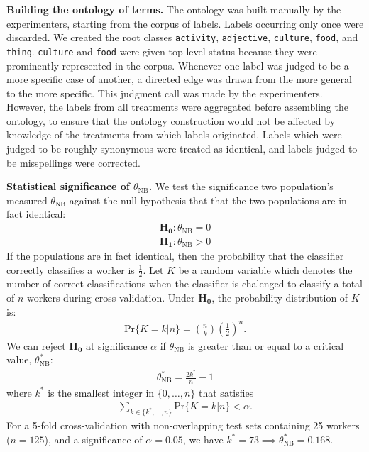 \documentclass[a4paper]{report}
\begin{document}
\textbf{Building the ontology of terms.}  The ontology was built manually
by the experimenters, starting from the corpus of labels. Labels occurring only 
once were discarded.  We created the root classes \texttt{activity}, 
\texttt{adjective}, \texttt{culture}, 
\texttt{food}, and \texttt{thing}. \texttt{culture} and \texttt{food} were 
given top-level status because they were prominently represented in the corpus.
Whenever one label was judged to be a more specific case of another, a
directed edge was drawn from the more general to the more specific. This
judgment call was made by the experimenters.  However, the labels from all 
treatments were aggregated before assembling the ontology,  to 
ensure that the ontology construction would not be affected by 
knowledge of the treatments from which labels originated. 
Labels which were judged to be roughly synonymous were treated as identical,
and labels judged to be misspellings were corrected. 

\textbf{Statistical significance of $\theta_\text{NB}$.}
We test the significance two population's measured $\theta_\text{NB}$ against 
the null hypothesis that that the two populations are in fact identical:
\begin{align}
	\mathbf{H_0}: \theta_\text{NB} = 0 \\
	\mathbf{H_1}: \theta_\text{NB} > 0
\end{align}
If the populations are in fact identical, then the probability that the 
classifier correctly classifies a worker is $\frac{1}{2}$. Let $K$ be a random
variable which denotes the number of correct classifications when the 
classifier is chalenged to classify a total of $n$ workers during 
cross-validation.  Under $\mathbf{H_0}$, the probability distribution of $K$ 
is:
\begin{align}
	\text{Pr}\{K = k | n \} = { n \choose k } \left(\frac{1}{2}\right)^n.
\end{align}
We can reject $\mathbf{H_0}$ at significance $\alpha$ if $\theta_\text{NB}$ 
is greater than or equal to a critical value, $\theta_\text{NB}^*$:
\begin{align}
	\theta^*_\text{NB} = \frac{2k^*}{n} - 1
\end{align}
where $k^*$ is the smallest integer in $\{0,\dots,n\}$ that satisfies 
\begin{align}
	\sum_{k \in \{k^*, \dots, n\}} \text{Pr}\{K = k | n \} < \alpha.
\end{align}
For a 5-fold cross-validation with non-overlapping test sets containing 25 
workers ($n = 125$), and a significance of $\alpha = 0.05$, we
have $k^*=73 \implies \theta_\text{NB}^* = 0.168$.
\end{document}
